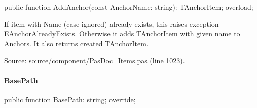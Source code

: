 \documentclass{report}
\newif\ifpdf
\begin{document}
\label{PasDoc_Items.TExternalItem-AddAnchor}
\begin{list}{}{
\setlength{\itemindent}{0cm}
\setlength{\listparindent}{0cm}
\setlength{\leftmargin}{\evensidemargin}
\addtolength{\leftmargin}{\tmplength}
\settowidth{\labelsep}{X}
\addtolength{\leftmargin}{\labelsep}
\setlength{\labelwidth}{\tmplength}
}
\item[\textbf{Declaration}\hfill]
\ifpdf
\begin{flushleft}
\fi
\begin{ttfamily}
public function AddAnchor(const AnchorName: string): TAnchorItem; overload;\end{ttfamily}

\ifpdf
\end{flushleft}
\fi

\par
\item[\textbf{Description}]
If item with Name (case ignored) already exists, this raises exception EAnchorAlreadyExists. Otherwise it adds TAnchorItem with given name to Anchors. It also returns created TAnchorItem.\par
\href{https://github.com/pasdoc/pasdoc/blob/master/source/component/PasDoc_Items.pas#L1023}{Source: source/component/PasDoc{\_}Items.pas (line 1023).}

\end{list}
\paragraph*{BasePath}\hspace*{\fill}

\label{PasDoc_Items.TExternalItem-BasePath}
\begin{list}{}{
\setlength{\itemindent}{0cm}
\setlength{\listparindent}{0cm}
\setlength{\leftmargin}{\evensidemargin}
\addtolength{\leftmargin}{\tmplength}
\settowidth{\labelsep}{X}
\addtolength{\leftmargin}{\labelsep}
\setlength{\labelwidth}{\tmplength}
}
\item[\textbf{Declaration}\hfill]
\ifpdf
\begin{flushleft}
\fi
\begin{ttfamily}
public function BasePath: string; override;\end{ttfamily}

\ifpdf
\end{flushleft}
\fi

\end{list}
\ifpdf
\end{document}
